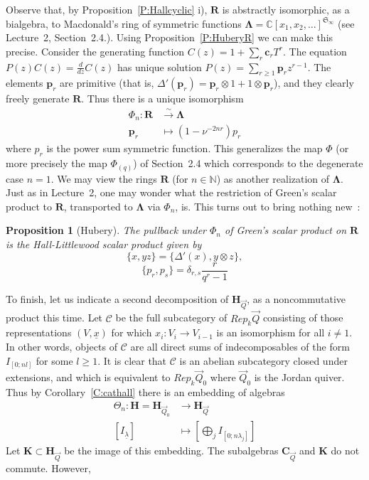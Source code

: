 \documentclass[a4paper,10pt]{amsart}
\def\H{\mathbf{H}}
\def\N{\mathbb{N}}
\def\C{\mathbb{C}}
\def\LLambda{\boldsymbol{\Lambda}}
\newtheorem{prop}[theo]{Proposition}
\numberwithin{equation}{section}
\begin{document}
\vspace{.15in}

Observe that, by Proposition~\ref{P:Hallcyclic} i), $\mathbf{R}$ is abstractly isomorphic, as a bialgebra, to Macdonald's ring of symmetric functions $\LLambda=\C[x_1, x_2,\ldots]^{\mathfrak{S}_{\infty}}$ (see Lecture~2, Section~2.4.). Using Proposition~\ref{P:HuberyR} we can make this precise. Consider the generating function $C(z)=1+\sum_r \mathbf{c}_rT^r$. The equation $P(z)C(z)=\frac{d}{dz}C(z)$ has unique solution $P(z)=\sum_{r\geq 1} \mathbf{p}_rz^{r-1}$. The elements $\mathbf{p}_r$ are primitive (that is, $\Delta'(\mathbf{p}_r)=\mathbf{p}_r \otimes 1 + 1 \otimes \mathbf{p}_r$), and they clearly freely generate $\mathbf{R}$. Thus there is a unique isomorphism
\begin{align*}
\Phi_n: \mathbf{R} &\stackrel{\sim}{\to} \LLambda\\
\mathbf{p}_r &\mapsto (1-\nu^{-2nr})p_r
\end{align*}
where $p_r$ is the power sum symmetric function.
This generalizes the map $\Phi$ (or more precisely the map $\Phi_{(q)}$) of Section~2.4 which corresponds to the degenerate case $n=1$. We may view the rings $\mathbf{R}$ (for $n \in \N$) as another realization of $\LLambda$. Just as in Lecture~2, one may wonder what the restriction of Green's scalar product to $\mathbf{R}$, transported to $\LLambda$ via $\Phi_n$, is. This turns out to bring nothing new~:

\vspace{.1in}

\begin{prop}[Hubery] The pullback under $\Phi_n$ of Green's scalar product on $\mathbf{R}$ is the Hall-Littlewood scalar product given by
$$\{x,yz\}=\{\Delta'(x) ,y\otimes z\},$$
\begin{equation}\label{E:HLnscalarprod}
\{p_r,p_s\}=\delta_{r,s}\frac{r}{q^r-1}
\end{equation}
\end{prop}

\vspace{.15in}

To finish, let us indicate a second decomposition of $\H_{\vec{Q}}$, as a noncommutative product this time. Let $\mathcal{C}$ be the full subcategory of $Rep_k\vec{Q}$ consisting of those representations $(V,\underline{x})$ for which $x_i: V_i \to V_{i-1}$ is an isomorphism for all $i \neq 1$. In other words, objects of $\mathcal{C}$ are all direct sums of indecomposables of the form $I_{[0;nl]}$ for some $l \geq 1$. It is clear that $\mathcal{C}$ is an abelian subcategory closed under extensions, and which is equivalent to $Rep_k\vec{Q}_0$ where $\vec{Q}_0$ is the Jordan quiver. Thus by Corollary~\ref{C:cathall} there is an embedding of algebras
\begin{align*}
\Theta_n: \H=\H_{\vec{Q}_0} &\to \H_{\vec{Q}}\\
[I_{\underline{\lambda}}] &\mapsto [\bigoplus_j I_{[0;n\lambda_j]}]
\end{align*}
Let $\mathbf{K} \subset \H_{\vec{Q}}$ be the image of this embedding. The subalgebras $\mathbf{C}_{\vec{Q}}$ and $\mathbf{K}$ do not commute. However,
\end{document}
